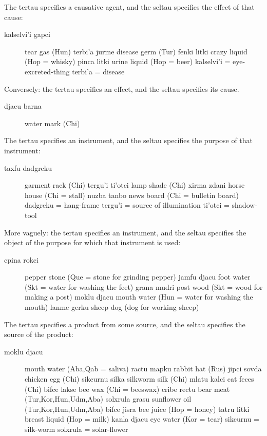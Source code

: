 The tertau specifies a causative agent, and the seltau
    specifies the effect of that cause: 
\begin{description}
\item[kalselvi'i gapci] tear gas (Hun) terbi'a jurme disease germ (Tur) fenki litki crazy liquid (Hop = whisky) pinca litki urine liquid (Hop = beer) kalselvi'i = eye-excreted-thing terbi'a = disease
\end{description}

Conversely: the tertau specifies an effect, and the seltau
    specifies its cause. 
\begin{description}
\item[djacu barna] water mark (Chi)
\end{description}

The tertau specifies an instrument, and the seltau specifies
    the purpose of that instrument: 
\begin{description}
\item[taxfu dadgreku] garment rack (Chi) tergu'i ti'otci lamp shade (Chi) xirma zdani horse house (Chi = stall) nuzba tanbo news board (Chi = bulletin board) dadgreku = hang-frame tergu'i = source of illumination ti'otci = shadow-tool
\end{description}

More vaguely: the tertau specifies an instrument, and the
    seltau specifies the object of the purpose for which that
    instrument is used: 
\begin{description}
\item[cpina rokci] pepper stone (Que = stone for grinding pepper) jamfu djacu foot water (Skt = water for washing the feet) grana mudri post wood (Skt = wood for making a post) moklu djacu mouth water (Hun = water for washing the mouth) lanme gerku sheep dog (dog for working sheep)
\end{description}

The tertau specifies a product from some source, and the seltau
    specifies the source of the product: 
\begin{description}
\item[moklu djacu] mouth water (Aba,Qab = saliva) ractu mapku rabbit hat (Rus) jipci sovda chicken egg (Chi) sikcurnu silka silkworm silk (Chi) mlatu kalci cat feces (Chi) bifce lakse bee wax (Chi = beeswax) cribe rectu bear meat (Tur,Kor,Hun,Udm,Aba) solxrula grasu sunflower oil (Tur,Kor,Hun,Udm,Aba) bifce jisra bee juice (Hop = honey) tatru litki breast liquid (Hop = milk) kanla djacu eye water (Kor = tear) sikcurnu = silk-worm solxrula = solar-flower
\end{description}

